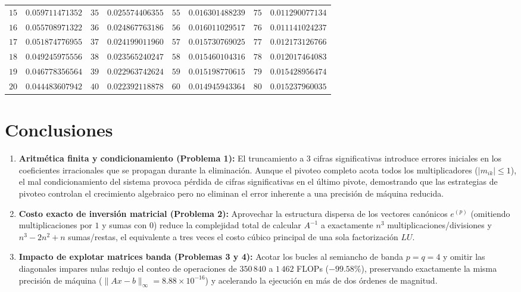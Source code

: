 \documentclass[11pt,letterpaper]{article}
\begin{document}
\begin{table}[H]
{\begin{tabular}{cc|cc|cc|cc}
        $15$ & $0.059711471352$ & $35$ & $0.025574406355$ & $55$ & $0.016301488239$ & $75$ & $0.011290077134$ \\
        $16$ & $0.055708971322$ & $36$ & $0.024867763186$ & $56$ & $0.016011029517$ & $76$ & $0.011141024237$ \\
        $17$ & $0.051874776955$ & $37$ & $0.024199011960$ & $57$ & $0.015730769025$ & $77$ & $0.012173126766$ \\
        $18$ & $0.049245975556$ & $38$ & $0.023565240247$ & $58$ & $0.015460104316$ & $78$ & $0.012017464083$ \\
        $19$ & $0.046778356564$ & $39$ & $0.022963742624$ & $59$ & $0.015198770615$ & $79$ & $0.015428956474$ \\
        $20$ & $0.044483607942$ & $40$ & $0.022392118878$ & $60$ & $0.014945943364$ & $80$ & $0.015237960035$ \\
        \bottomrule
    \end{tabular}%
    }
\end{table}

\section{Conclusiones}
\begin{enumerate}
    \item \textbf{Aritmética finita y condicionamiento (Problema 1):} El truncamiento a $3$ cifras significativas introduce errores iniciales en los coeficientes irracionales que se propagan durante la eliminación. Aunque el pivoteo completo acota todos los multiplicadores ($|m_{ik}| \le 1$), el mal condicionamiento del sistema provoca pérdida de cifras significativas en el último pivote, demostrando que las estrategias de pivoteo controlan el crecimiento algebraico pero no eliminan el error inherente a una precisión de máquina reducida.
    \item \textbf{Costo exacto de inversión matricial (Problema 2):} Aprovechar la estructura dispersa de los vectores canónicos $e^{(p)}$ (omitiendo multiplicaciones por $1$ y sumas con $0$) reduce la complejidad total de calcular $A^{-1}$ a exactamente $n^3$ multiplicaciones/divisiones y $n^3 - 2n^2 + n$ sumas/restas, el equivalente a tres veces el costo cúbico principal de una sola factorización $LU$.
    \item \textbf{Impacto de explotar matrices banda (Problemas 3 y 4):} Acotar los bucles al semiancho de banda $p = q = 4$ y omitir las diagonales impares nulas redujo el conteo de operaciones de $350\,840$ a $1\,462$ FLOPs ($-99.58\%$), preservando exactamente la misma precisión de máquina ($\|Ax - b\|_\infty = 8.88 \times 10^{-16}$) y acelerando la ejecución en más de dos órdenes de magnitud.
\end{enumerate}
\end{document}
